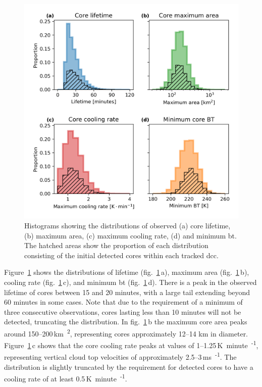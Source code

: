 \begin{figure}[tp]
    \centering
    \includegraphics[width=\textwidth]{figures/chapter2_08.png}
    \caption[
    Histograms showing the distributions of observed core lifetimes, maximum areas, cooling rates and \acrshort{bt}
    ]{
    Histograms showing the distributions of observed (a) core lifetime, (b) maximum area, (c) maximum cooling rate, (d) and minimum \acrshort{bt}. The hatched areas show the proportion of each distribution consisting of the initial detected cores within each tracked \acrshort{dcc}.
    }
    \label{fig:core_properties}
\end{figure}

Figure~\ref{fig:core_properties} shows the distributions of lifetime (fig.~\ref{fig:core_properties}\,a), maximum area (fig.~\ref{fig:core_properties}\,b), cooling rate (fig.~\ref{fig:core_properties}\,c), and minimum \acrshort{bt} (fig.~\ref{fig:core_properties}\,d).
There is a peak in the observed lifetime of cores between 15 and 20 minutes, with a large tail extending beyond 60 minutes in some cases.
Note that due to the requirement of a minimum of three consecutive observations, cores lasting less than 10 minutes will not be detected, truncating the distribution.
In fig.~\ref{fig:core_properties}\,b the maximum core area peaks around 150--200\,\unit{km\textsuperscript{2}}, representing cores approximately 12--14 km in diameter.
Figure~\ref{fig:core_properties}\,c shows that the core cooling rate peaks at values of 1--1.25\,\unit{K minute\textsuperscript{-1}}, representing vertical cloud top velocities of approximately 2.5--3\,\unit{ms\textsuperscript{-1}}.
The distribution is slightly truncated by the requirement for detected cores to have a cooling rate of at least 0.5\,\unit{K minute\textsuperscript{-1}}.

